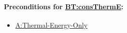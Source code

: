 \documentclass[12pt]{article}
\begin{document}
\begin{minipage}{\textwidth}
\begin{tabular}{>{\raggedright}p{}>{\raggedright\arraybackslash}p{}}
\\ \bottomrule
\end{tabular}
\end{minipage}


\paragraph{Preconditions for \hyperref[BT:consThermE]{BT:consThermE}:}
\label{BT:consThermEPrecond}

\begin{itemize}
\item \hyperref[assumpTEO]{A:Thermal-Energy-Only}
\end{itemize}

\end{document}
